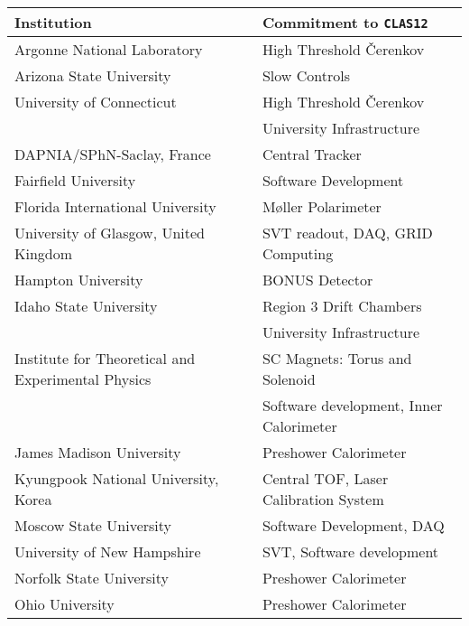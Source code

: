 \begin{table}
\begin{small}
\begin{center}
\begin{tabular}{||l||l||} \hline \hline
Institution                            & Commitment to {\tt CLAS12} \\ \hline 
Argonne National Laboratory            & High Threshold {\v C}erenkov \\ \hline 
Arizona State University               & Slow Controls \\ \hline
University of Connecticut              & High Threshold {\v C}erenkov \\ 
                                       & University Infrastructure \\ \hline
DAPNIA/SPhN-Saclay, France             & Central Tracker \\ \hline
Fairfield University                   & Software Development \\ \hline
Florida International University       & M{\o}ller Polarimeter \\ \hline
University of Glasgow, United Kingdom  & SVT readout, DAQ, GRID Computing \\ \hline
Hampton University                     & BONUS Detector \\ \hline
Idaho State University                 & Region 3 Drift Chambers \\
                                       & University Infrastructure \\ \hline
Institute for Theoretical and Experimental Physics & SC Magnets: Torus and Solenoid  \\
                                       & Software development, Inner Calorimeter \\ \hline
James Madison University               & Preshower Calorimeter \\ \hline
Kyungpook National University, Korea   & Central TOF, Laser Calibration System \\ \hline
Moscow State University                & Software Development, DAQ \\ \hline 
University of New Hampshire            & SVT, Software development \\ \hline
Norfolk State University               & Preshower Calorimeter \\ \hline
Ohio University                        & Preshower Calorimeter \\ \hline 

\end{tabular}
\end{center}
\end{small}
\end{table}
